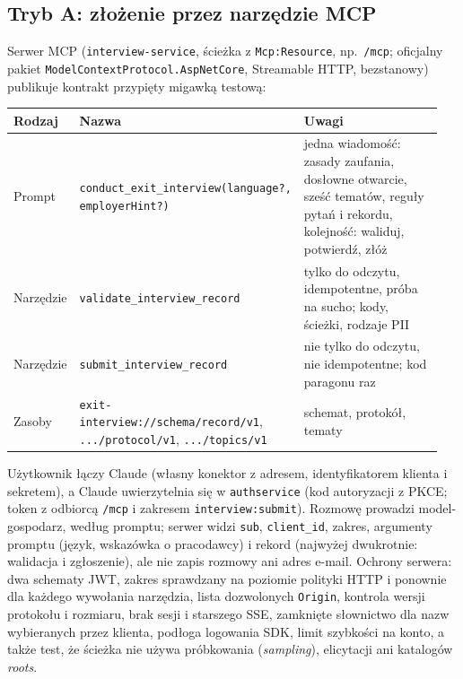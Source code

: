 \subsection{Tryb A: złożenie przez narzędzie MCP}

Serwer MCP (\texttt{interview-service}, ścieżka z \texttt{Mcp:Resource}, np.\
\texttt{/mcp}; oficjalny pakiet \texttt{ModelContext}\allowbreak\texttt{Protocol.AspNetCore}, Streamable
HTTP, bezstanowy) publikuje kontrakt przypięty migawką testową:

\begin{longtable}{@{}p{0.14\linewidth}p{0.36\linewidth}p{0.45\linewidth}@{}}
\toprule
Rodzaj & Nazwa & Uwagi \\
\midrule
\endhead
Prompt & \texttt{conduct\_exit\_}\allowbreak\texttt{interview(language?,} \texttt{employerHint?)} & jedna
  wiadomość: zasady zaufania, dosłowne otwarcie, sześć tematów, reguły pytań
  i rekordu, kolejność: waliduj, potwierdź, złóż \\
Narzędzie & \texttt{validate\_}\allowbreak\texttt{interview\_record} & tylko do odczytu, idempotentne,
  próba na sucho; kody, ścieżki, rodzaje PII \\
Narzędzie & \texttt{submit\_}\allowbreak\texttt{interview\_record} & nie tylko do odczytu, nie
  idempotentne; kod paragonu raz \\
Zasoby & \texttt{exit-interview://}\allowbreak\texttt{schema/}\allowbreak\texttt{record/v1},
  \texttt{.../protocol/v1}, \texttt{.../topics/v1} & schemat, protokół, tematy \\
\bottomrule
\end{longtable}

{\sloppy Użytkownik łączy Claude (własny konektor z adresem, identyfikatorem klienta
i sekretem), a Claude uwierzytelnia się w \texttt{authservice}
(kod autoryzacji z PKCE; token z odbiorcą \texttt{/mcp} i zakresem
\texttt{interview:submit}). Rozmowę prowadzi model-gospodarz,
według promptu; serwer widzi \texttt{sub}, \texttt{client\_id}, zakres, argumenty promptu
(język, wskazówka o pracodawcy) i rekord (najwyżej dwukrotnie: walidacja
i zgłoszenie), ale nie zapis rozmowy ani adres e-mail. Ochrony serwera: dwa
schematy JWT, zakres sprawdzany na poziomie polityki HTTP i ponownie dla
każdego wywołania narzędzia, lista dozwolonych \texttt{Origin}, kontrola wersji
protokołu i rozmiaru, brak sesji i starszego SSE, zamknięte słownictwo dla nazw
wybieranych przez klienta, podłoga logowania SDK, limit szybkości na konto, a
także test, że ścieżka nie używa próbkowania (\emph{sampling}), elicytacji ani
katalogów \emph{roots}.\par}


